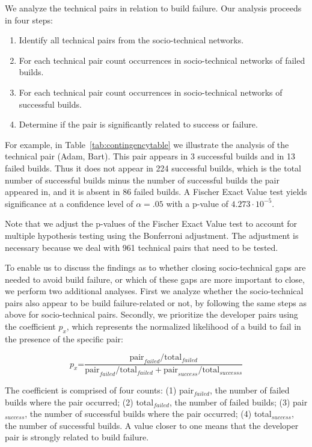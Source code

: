 We analyze the technical pairs in relation to build failure. 
Our analysis proceeds in four steps:

\begin{enumerate}
\item Identify all technical pairs from the socio-technical networks.
\item For each technical pair count occurrences in socio-technical networks of
failed builds.
\item For each technical pair count occurrences in socio-technical networks of
successful builds.
\item Determine if the pair is significantly related to success or failure.
\end{enumerate}

For example, in Table~\ref{tab:contingencytable} we illustrate the analysis of
the technical pair (Adam, Bart). This pair appears in 3 successful builds and in
13 failed builds. Thus it does not appear in 224 successful builds, which is the total number of successful builds minus the number of successful builds the pair appeared in, and it is absent in 86 failed builds.
A Fischer Exact Value test yields significance at a confidence level of $\alpha = .05$ with a p-value of $4.273\cdot10^{-5}$.

Note that we adjust the p-values of the Fischer Exact Value test to account for multiple hypothesis testing using the Bonferroni adjustment.
The adjustment is necessary because we deal with 961 technical pairs that need to be tested. 

To enable us to discuss the findings as to whether closing socio-technical gaps
are needed to avoid build failure, or which of these gaps are more important to
close, we perform two additional analyses. 
First we analyze whether the
socio-technical pairs also appear to be build failure-related or not, by
following the same steps as above for socio-technical pairs. 
%
Secondly, we prioritize the developer pairs using the coefficient $p_x$,
which represents the normalized likelihood of a build
to fail in the presence of the specific pair:

\begin{equation}
p_x\text{=}\frac{ \text{pair}_{failed} / \text{total}_{failed} }
                     { \text{pair}_{failed} / \text{total}_{failed} + \text{pair}_{success} / \text{total}_{successs}}
\end{equation}

The coefficient is comprised of four counts: (1) pair$_{failed}$, the number of failed builds where the pair occurred; (2) total$_{failed}$, the number of failed builds; (3) pair$_{success}$, the number of successful builds where the pair occurred; (4) total$_{success}$, the number of successful builds.
A value closer to one means that the developer pair is strongly related to build
failure.



